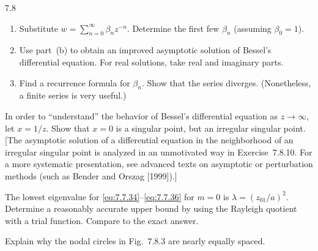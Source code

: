 \begin{exercises}{7.8}
\begin{enumerate}
\item[(b)] Substitute $w = \sum_{n=0}^{\infty}\beta_n z^{-n}$.  Determine the first few $\beta_n$ (assuming $\beta_0 = 1$).

\item[(c)] Use part~(b) to obtain an improved asymptotic solution of Bessel's differential equation.  For real solutions, take real and imaginary parts.

\item[(d)] Find a recurrence formula for $\beta_n$.  Show that the series diverges.  (Nonetheless, a finite series is very useful.)
\end{enumerate}

\item In order to ``understand'' the behavior of Bessel's differential equation as $z \to \infty$, let $x = 1/z$.  Show that $x = 0$ is a singular point, but an irregular singular point.  [The asymptotic solution of a differential equation in the neighborhood of an irregular singular point is analyzed in an unmotivated way in Exercise~7.8.10.  For a more systematic presentation, see advanced texts on asymptotic or perturbation methods (such as Bender and Orszag [1999]).]

\item The lowest eigenvalue for \eqref{eq:7.7.34}--\eqref{eq:7.7.36} for $m = 0$ is $\lambda = (z_{01}/a)^2$.  Determine a reasonably accurate upper bound by using the Rayleigh quotient with a trial function.  Compare to the exact answer.

\item Explain why the nodal circles in Fig.~7.8.3 are nearly equally spaced.

\end{exercises}
